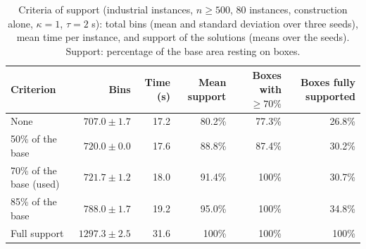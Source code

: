\begin{table}[t]
\centering
\small\setlength{\tabcolsep}{4pt}
\caption{Criteria of support (industrial instances, $n\ge 500$, 80 instances, construction alone, $\kappa=1$, $\tau=2$ s): total bins (mean and standard deviation over three seeds), mean time per instance, and support of the solutions (means over the seeds). Support: percentage of the base area resting on boxes.}
\label{tab:e-support}
\begin{tabular}{@{}lrrrrr@{}}
\toprule
Criterion & Bins & Time (s) & Mean support & Boxes with $\ge 70\%$ & Boxes fully supported\\
\midrule
None & $707.0\pm 1.7$ & 17.2 & 80.2\% & 77.3\% & 26.8\%\\
50\% of the base & $720.0\pm 0.0$ & 17.6 & 88.8\% & 87.4\% & 30.2\%\\
70\% of the base (used) & $721.7\pm 1.2$ & 18.0 & 91.4\% & 100\% & 30.7\%\\
85\% of the base & $788.0\pm 1.7$ & 19.2 & 95.0\% & 100\% & 34.8\%\\
Full support & $1297.3\pm 2.5$ & 31.6 & 100\% & 100\% & 100\%\\
\bottomrule
\end{tabular}
\end{table}
